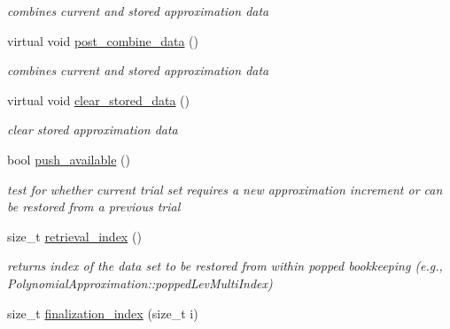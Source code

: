 \begin{DoxyCompactItemize}
\begin{DoxyCompactList}\small\item\em combines current and stored approximation data \end{DoxyCompactList}\item 
virtual void \hyperlink{classPecos_1_1SharedPolyApproxData_a1fc086359221b123564e92c4ccee5a20}{post\+\_\+combine\+\_\+data} ()\label{classPecos_1_1SharedPolyApproxData_a1fc086359221b123564e92c4ccee5a20}

\begin{DoxyCompactList}\small\item\em combines current and stored approximation data \end{DoxyCompactList}\item 
virtual void \hyperlink{classPecos_1_1SharedPolyApproxData_a263397cd08813d707b4084cf13cad679}{clear\+\_\+stored\+\_\+data} ()\label{classPecos_1_1SharedPolyApproxData_a263397cd08813d707b4084cf13cad679}

\begin{DoxyCompactList}\small\item\em clear stored approximation data \end{DoxyCompactList}\item 
bool \hyperlink{classPecos_1_1SharedPolyApproxData_a610286fcad89a0c993368c96fb9e86dc}{push\+\_\+available} ()\label{classPecos_1_1SharedPolyApproxData_a610286fcad89a0c993368c96fb9e86dc}

\begin{DoxyCompactList}\small\item\em test for whether current trial set requires a new approximation increment or can be restored from a previous trial \end{DoxyCompactList}\item 
size\+\_\+t \hyperlink{classPecos_1_1SharedPolyApproxData_a7bba340223dc93f72d640df771b13d22}{retrieval\+\_\+index} ()\label{classPecos_1_1SharedPolyApproxData_a7bba340223dc93f72d640df771b13d22}

\begin{DoxyCompactList}\small\item\em returns index of the data set to be restored from within popped bookkeeping (e.\+g., Polynomial\+Approximation\+::popped\+Lev\+Multi\+Index) \end{DoxyCompactList}\item 
size\+\_\+t \hyperlink{classPecos_1_1SharedPolyApproxData_a1fd1f6bbfd21d08c77b5327b6e955ce8}{finalization\+\_\+index} (size\+\_\+t i)\label{classPecos_1_1SharedPolyApproxData_a1fd1f6bbfd21d08c77b5327b6e955ce8}


\end{DoxyCompactItemize}

